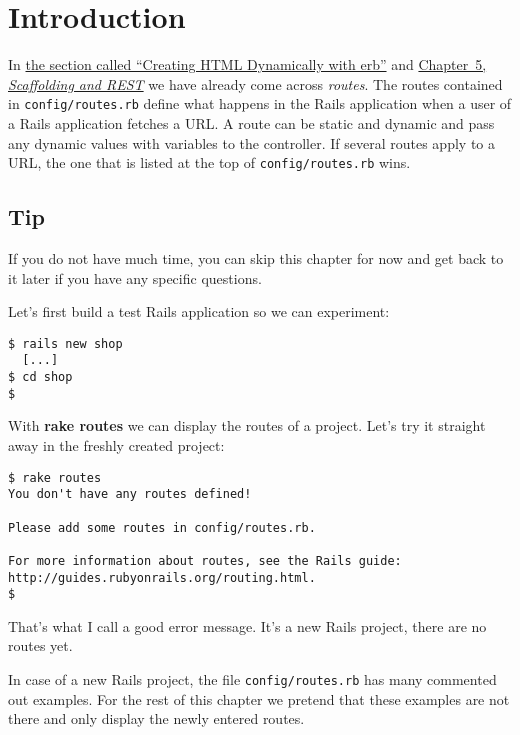 \documentclass[a4paper]{book}
\newcommand{\chap}[1]{\newpage\thispagestyle{empty}\chapter{#1}\label{chap:\thechapter}}
\begin{document}
\hyperdef{}{routes}{\chap{Routes}\label{routes}}

\section{Introduction}\label{introduction-2}

In \hyperref[dynamischeux5fwebseiten]{the section called “Creating HTML Dynamically with erb”} and \hyperref[scaffolding]{Chapter~5, \emph{Scaffolding and REST}} we have already come across \emph{routes}. The routes contained in \texttt{config/routes.rb} define what happens in the Rails application when a user of a Rails application fetches a URL. A route can be static and dynamic and pass any dynamic values with variables to the controller. If several routes apply to a URL, the one that is listed at the top of \texttt{config/routes.rb} wins.

\subsection{Tip}\label{tip-14}

If you do not have much time, you can skip this chapter for now and get back to it later if you have any specific questions.

Let's first build a test Rails application so we can experiment:

\begin{shaded}\begin{verbatim}
$ rails new shop
  [...]
$ cd shop
$
\end{verbatim}\end{shaded}

With \textbf{rake routes} we can display the routes of a project. Let's try it straight away in the freshly created project:

\begin{shaded}\begin{verbatim}
$ rake routes
You don't have any routes defined!

Please add some routes in config/routes.rb.

For more information about routes, see the Rails guide: http://guides.rubyonrails.org/routing.html.
$
\end{verbatim}\end{shaded}

That's what I call a good error message. It's a new Rails project, there are no routes yet.

In case of a new Rails project, the file \texttt{config/routes.rb} has many commented out examples. For the rest of this chapter we pretend that these examples are not there and only display the newly entered routes.
\end{document}
